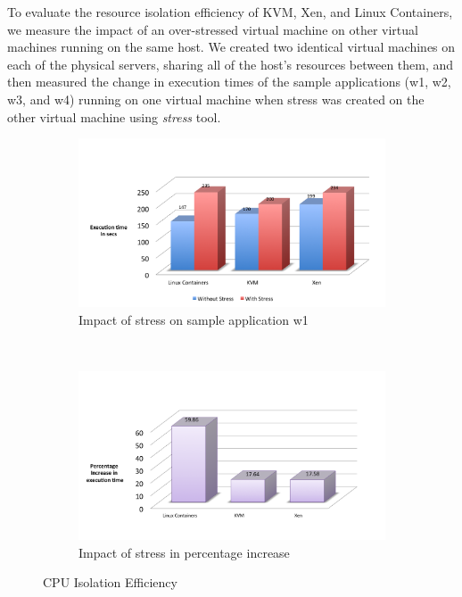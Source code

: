 To evaluate the resource isolation efficiency of KVM, Xen, and Linux Containers, we measure the impact of an over-stressed virtual machine on other virtual machines running on the same host. We created two identical virtual machines on each of the physical servers, sharing all of the host's resources between them, and then measured the change in execution times of the sample applications (w1, w2, w3, and w4) running on one virtual machine when stress was created on the other virtual machine using \emph{stress} \cite{stress} tool.
\begin{figure}[H]
        \centering
        \begin{subfigure}[b]{0.99\textwidth}
                \includegraphics[width=\textwidth]{cpustress.png}
                \caption{Impact of stress on sample application w1}
                \label{fig:cpustress1}
        \end{subfigure}%
        ~ %
        \qquad \newline %
        \begin{subfigure}[b]{0.8\textwidth}
                \includegraphics[width=\textwidth]{cpustressp.png}
                \caption{Impact of stress in percentage increase}
                \label{fig:cpustressp}
        \end{subfigure}
        \caption{CPU Isolation Efficiency}\label{fig:cpuisolation}
\end{figure}

